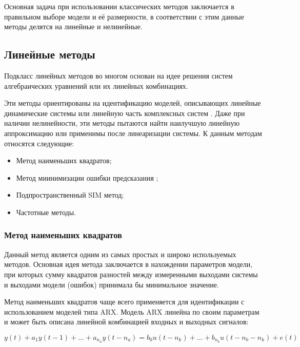 Основная задача при использовании классических методов заключается в правильном
выборе модели и её размерности, в соответствии с этим данные методы делятся на
линейные и нелинейные.

\subsection{Линейные методы}

Подкласс линейных методов во многом основан на идее решения систем
алгебраических уравнений или их линейных комбинациях. 

Эти методы ориентированы на идентификацию моделей, описывающих линейные
динамические системы или линейную часть комплексных систем \cite{bib:ident:linear}. 
Даже при наличии нелинейности, эти методы пытаются найти наилучшую линейную 
аппроксимацию или применимы после линеаризации системы. К данным методам относятся 
следующие:
\begin{itemize}
  \item Метод наименьших квадратов;
  \item Метод миинимизации ошибки предсказания ;
  \item Подпространственный SIM метод;
  \item Частотные методы.
\end{itemize}

\subsubsection{Метод наименьших квадратов}

Данный метод является одним из самых простых и широко используемых методов. Основная
идея метода заключается в нахождении параметров модели, при которых сумму
квадратов разностей между измеренными выходами системы и выходами модели
(ошибок) принимала бы минимальное значение.

Метод наименьших квадратов чаще всего применяется для идентификации с
использованием моделей типа ARX. Модель ARX линейна по своим параметрам и
может быть описана линейной комбинацией входных и выходных сигналов:

\begin{equation}
  y(t)+a_1y(t-1)+\dots+a_{n_a}y(t-n_a)=b_0u(t-n_k)+\dots+b_{n_b}u(t-n_b-n_k)+e(t)
  \label{eq:arx}
\end{equation}

